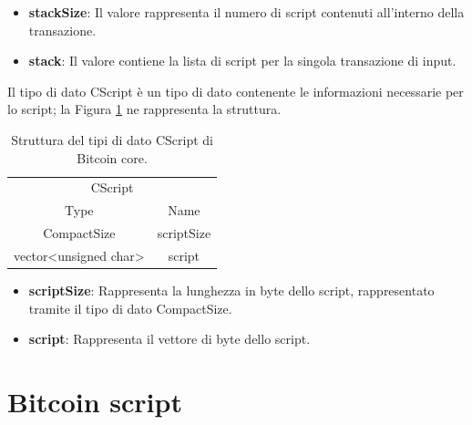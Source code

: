 \begin{itemize}
  \item {\bf stackSize\/}: Il valore rappresenta il numero di script contenuti all’interno della transazione.
  \item {\bf stack\/}: Il valore contiene la lista di script per la singola transazione di input.
\end{itemize}
\leavevmode
\newline
Il tipo di dato CScript è un tipo di dato contenente le informazioni necessarie per lo script; la Figura \ref{tab:scriptbitcoinc} ne rappresenta la struttura.


\begin{table}
       \centering\small
           \begin{tabular}{cc}
               \toprule
                 \multicolumn{2}{c}{CScript} \\
                 \cmidrule(lr){1-2}
                 \multicolumn{1}{c}{Type} & \multicolumn{1}{c}{Name} \\
               \midrule
               CompactSize & scriptSize   \\
               vector<unsigned char> & script \\
               \bottomrule
       \end{tabular}
       \caption{Struttura del tipi di dato CScript di Bitcoin core.\label{tab:scriptbitcoinc}}
   \end{table}

\begin{itemize}
  \item {\bf scriptSize\/}: Rappresenta la lunghezza in byte dello script, rappresentato tramite il tipo di dato CompactSize.
  \item {\bf script\/}: Rappresenta il vettore di byte dello script.
\end{itemize}
\leavevmode
\newpage
\section{Bitcoin script}
\label{sec:bitcoinScriptBitcoinCore}


